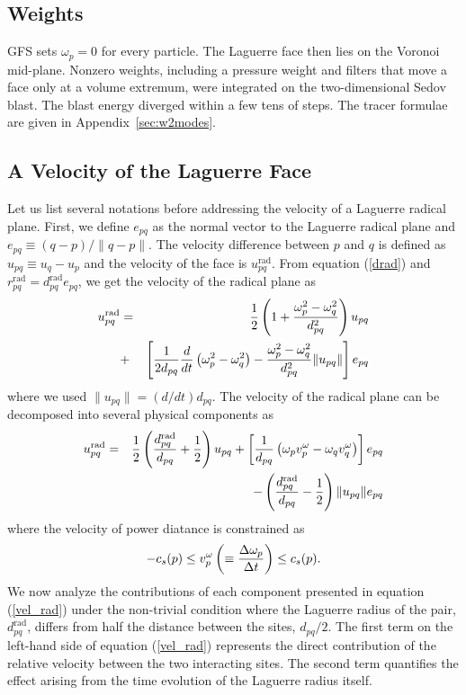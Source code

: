 \documentclass[twocolumn]{aastex63}
\newcommand{\vel}{{u}}
\begin{document}
\subsection{Weights}
\label{sec:weights}
GFS sets $\omega_p=0$ for every particle.
The Laguerre face then lies on the Voronoi mid-plane.
Nonzero weights, including a pressure weight and filters that move a face only at a volume extremum, were integrated on the two-dimensional Sedov blast.
The blast energy diverged within a few tens of steps.
The tracer formulae are given in Appendix~\ref{sec:w2modes}.

\subsection{A Velocity of the Laguerre Face}
Let us list several notations before addressing the velocity of a Laguerre radical plane. First, we define $e_{pq}$ as the normal vector to the Laguerre radical plane and $e_{pq} \equiv (q-p)/\|q-p\|$. The velocity difference between $p$ and $q$ is defined as $\vel_{pq} \equiv \vel_q-\vel_p$ and the velocity of the face is  $\vel_{pq}^\textrm{rad}$.  From equation (\ref{drad}) and $r_{pq}^\textrm{rad} = d_{pq}^\textrm{rad} e_{pq}$, we get the velocity of the radical plane as
\begin{eqnarray} \nonumber
	u^\textrm{rad}_{pq} &=&
	{1\over 2}  \left( 1+{ \omega^2_p -\omega^2_q \over d^2_{pq}}\right)u_{pq} \\
	&+&\left[{1\over2 d_{pq}}{{d  \over d t}\left(\omega^2_p -\omega^2_q\right) } 
	- {\omega_p^2-\omega_q^2 \over d_{pq}^2} \|u_{pq}\| \right] e_{pq}
\end{eqnarray} 
where we used $\| u_{pq}\| = (d/dt) d_{pq}$.
The velocity of the radical plane can be decomposed into several physical components as
\begin{eqnarray}  \nonumber
	\vel_{pq}^\textrm{rad} 
	&=&   {1\over2}\left({d_{pq}^\textrm{rad}\over d_{pq}}+{1\over2}\right){\vel_{pq}} \nonumber
	  	+  \left[{1\over d_{pq}}    \left( {\omega_p}v^\omega_{p} -{\omega_q }  {v^\omega_{q} }\right)  \right] e_{pq} \\  	\label{vel_rad}
		&&- \left({d_{pq}^\textrm{rad}\over d_{pq}}-{1\over2}\right) \|u_{pq}\| e_{pq}  
\end{eqnarray}
where the velocity of power diatance  is constrained as
\begin{equation}
	-c_s(p)\le  v_{p}^\omega \left(\equiv {\Delta\omega_p \over \Delta t}\right) \le c_s(p).
\end{equation}
We now analyze the contributions of each component presented in equation (\ref{vel_rad}) under the non-trivial condition where the Laguerre radius of the pair, $d_{pq}^\textrm{rad}$, differs from half the distance between the sites, $d_{pq}/2$. The first term on the left-hand side of equation (\ref{vel_rad}) represents the direct contribution of the {relative velocity} between the two interacting sites. The {second term} quantifies the effect arising from the {time evolution} of the {Laguerre radius} itself. 
\end{document}
